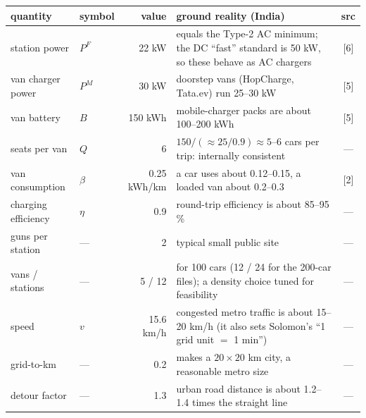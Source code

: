 \small
\begin{tabularx}{\linewidth}{@{}llr>{\raggedright\arraybackslash}Xc@{}}
\toprule
quantity & symbol & value & ground reality (India) & src \\
\midrule
station power & $P^{F}$ & 22 kW & equals the Type-2 AC minimum; the DC ``fast'' standard is 50 kW, so these behave as AC chargers & [6] \\
van charger power & $P^{M}$ & 30 kW & doorstep vans (HopCharge, Tata.ev) run 25--30 kW & [5] \\
van battery & $B$ & 150 kWh & mobile-charger packs are about 100--200 kWh & [5] \\
seats per van & $Q$ & 6 & $150/(\approx 25/0.9)\approx 5$--$6$ cars per trip: internally consistent & --- \\
van consumption & $\beta$ & 0.25 kWh/km & a car uses about 0.12--0.15, a loaded van about 0.2--0.3 & [2] \\
charging efficiency & $\eta$ & 0.9 & round-trip efficiency is about 85--95\,\% & --- \\
guns per station & --- & 2 & typical small public site & --- \\
vans / stations & --- & 5 / 12 & for 100 cars (12 / 24 for the 200-car files); a density choice tuned for feasibility & --- \\
speed & $v$ & 15.6 km/h & congested metro traffic is about 15--20 km/h (it also sets Solomon's ``1 grid unit $=$ 1 min'') & --- \\
grid-to-km & --- & 0.2 & makes a $20\times20$ km city, a reasonable metro size & --- \\
detour factor & --- & 1.3 & urban road distance is about 1.2--1.4 times the straight line & --- \\
\bottomrule
\end{tabularx}
